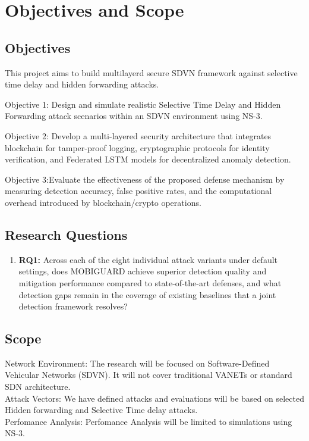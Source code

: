 \documentclass[12pt, a4paper]{report}
\begin{document}
\section{Objectives and Scope}

\subsection{Objectives}

This project aims to build multilayerd secure SDVN framework against selective time delay and hidden forwarding attacks.

Objective 1: Design and simulate realistic Selective Time Delay and Hidden Forwarding attack scenarios within an SDVN environment using NS-3.


Objective 2: Develop a multi-layered security architecture that integrates blockchain for tamper-proof logging, cryptographic protocols for identity verification, and Federated LSTM models for decentralized anomaly detection.


Objective 3:Evaluate the effectiveness of the proposed defense mechanism by
measuring detection accuracy, false positive rates, and the computational overhead
introduced by blockchain/crypto operations.



\subsection{Research Questions}
\label{sec:rqs}

\begin{enumerate}
    
    \item \textbf{RQ1:}
    Across each of the eight individual attack variants
    under default settings, does MOBIGUARD achieve
    superior detection quality and mitigation performance
    compared to state-of-the-art defenses, and what
    detection gaps remain in the coverage of existing
    baselines that a joint detection framework resolves?

\end{enumerate}


\vspace{0.5\baselineskip}

\subsection{Scope}

\noindent Network Environment: The research will be focused on Software-Defined Vehicular Networks (SDVN). It will not cover traditional VANETs or standard SDN architecture.\\[\baselineskip]
\noindent Attack Vectors: We have defined attacks and evaluations will be based on selected Hidden forwarding and Selective Time delay attacks.\\[\baselineskip]
\noindent Perfomance Analysis: Perfomance Analysis will be limited to simulations using NS-3.
\end{document}
